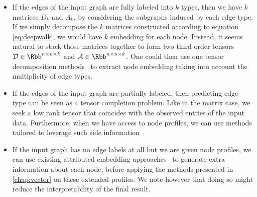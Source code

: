 \begin{itemize}

  \item If the edges of the input graph are fully labeled into $k$ types, then we have $k$ matrices
    $D_k$ and $A_k$, by considering the subgraphs induced by each edge type. If we simply decompose
    the $k$ matrices constructed according to equation \eqref{eq:deepwalk}, we would have $k$
    embedding for each node. Instead, it seems natural to stack those matrices together to form two
    third order tensors $\mathcal{D} \in \Rbb^{n \times n \times k}$ and $\mathcal{A} \in \Rbb^{n
    \times n \times k}$. One could then use one tensor decomposition
    methods~\autocites{tensorReview09}{tensorReview17} to extract node embedding taking into account
    the multiplicity of edge types.

  \item If the edges of the input graph are partially labeled, then predicting edge type can be seen
    as a tensor completion problem. Like in the matrix case, we seek a low rank tensor that
    coincides with the observed entries of the input data. Furthermore, when we have access to node
    profiles, we can use methods tailored to leverage such side information~\autocite[Section
    4]{tensorCompletion17}.

  \item If the input graph has no edge labels at all but we are given node profiles, we can use
    existing attributed embedding approaches~\autocites{Liao2017}{AANE17}{DynamicEmbedding17} to
    generate extra information about each node, before applying the methods presented in
    \autoref{chap:vector} on these extended profiles. We note however that
    doing so might reduce the interpretability of the final result.

\end{itemize}

